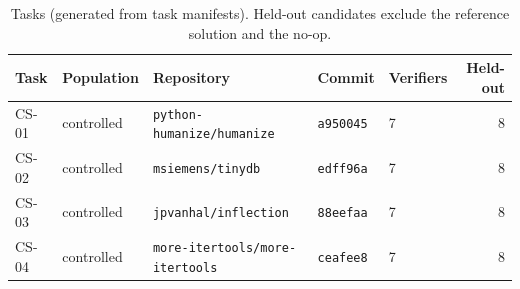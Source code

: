 \begin{table}[t]\centering\small
\caption{Tasks (generated from task manifests). Held-out candidates exclude the reference solution and the no-op.}\label{tab:tasks}
\begin{tabular}{lllllr}\toprule Task & Population & Repository & Commit & Verifiers & Held-out \\\midrule
CS-01 & controlled & \texttt{python-humanize/humanize} & \texttt{a950045} & 7 & 8 \\
CS-02 & controlled & \texttt{msiemens/tinydb} & \texttt{edff96a} & 7 & 8 \\
CS-03 & controlled & \texttt{jpvanhal/inflection} & \texttt{88eefaa} & 7 & 8 \\
CS-04 & controlled & \texttt{more-itertools/more-itertools} & \texttt{ceafee8} & 7 & 8 \\
\bottomrule\end{tabular}\end{table}
